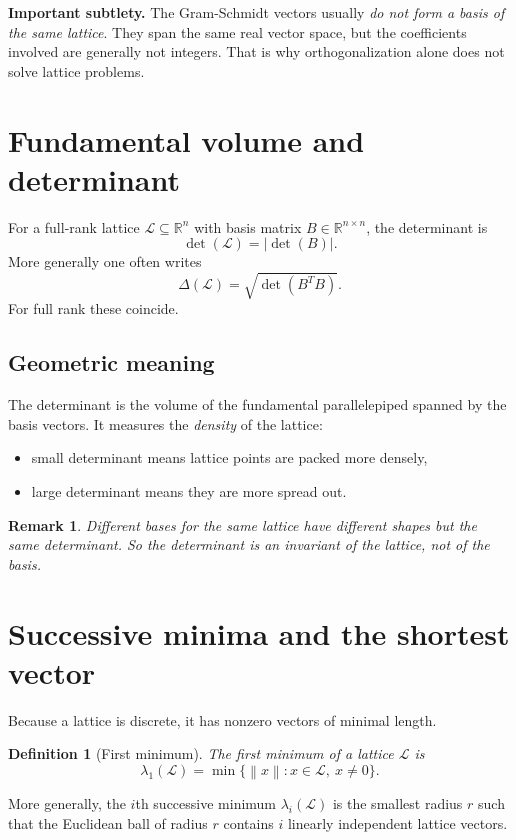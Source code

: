 \documentclass[11pt]{article}
\newtheorem{definition}[theorem]{Definition}
\newtheorem{remark}[theorem]{Remark}
\newenvironment{warningbox}{%
  \def\FrameCommand{\fboxrule=0.8pt \fboxsep=8pt \colorbox{warnred}}%
  \MakeFramed{\advance\hsize-\width \FrameRestore}}{\endMakeFramed}
\newcommand{\R}{\mathbb{R}}
\newcommand{\norm}[1]{\left\lVert #1 \right\rVert}
\newcommand{\calL}{\mathcal{L}}
\begin{document}
\begin{warningbox}
\textbf{Important subtlety.} The Gram-Schmidt vectors usually \emph{do not form a basis of the same lattice}. They span the same real vector space, but the coefficients involved are generally not integers. That is why orthogonalization alone does not solve lattice problems.
\end{warningbox}

\section{Fundamental volume and determinant}

For a full-rank lattice $\calL\subseteq \R^n$ with basis matrix $B\in \R^{n\times n}$, the determinant is
\[
\det(\calL)=|\det(B)|.
\]
More generally one often writes
\[
\Delta(\calL)=\sqrt{\det(B^TB)}.
\]
For full rank these coincide.

\subsection{Geometric meaning}
The determinant is the volume of the fundamental parallelepiped spanned by the basis vectors. It measures the \emph{density} of the lattice:
\begin{itemize}
    \item small determinant means lattice points are packed more densely,
    \item large determinant means they are more spread out.
\end{itemize}

\begin{remark}
Different bases for the same lattice have different shapes but the same determinant. So the determinant is an invariant of the lattice, not of the basis.
\end{remark}

\section{Successive minima and the shortest vector}

Because a lattice is discrete, it has nonzero vectors of minimal length.

\begin{definition}[First minimum]
The first minimum of a lattice $\calL$ is
\[
\lambda_1(\calL)=\min\{\norm{x}:x\in \calL,\ x\neq 0\}.
\]
\end{definition}

More generally, the $i$th successive minimum $\lambda_i(\calL)$ is the smallest radius $r$ such that the Euclidean ball of radius $r$ contains $i$ linearly independent lattice vectors.
\end{document}
